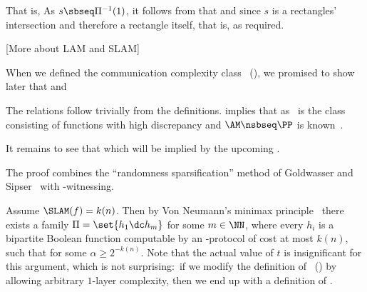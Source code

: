 That is,
As $s\sbseq\Pi^{-1}(1)$, it follows from  that
and since $s$ is a rectangles' intersection and therefore a rectangle itself,
that is,
as required.
\prfend

[More about LAM and SLAM]

When we defined the communication complexity class \SLAM\ (), we promised to show later that
\mal{
\NP, \MA, \UAMc, \UAM, \SBP, \LAM ~ \sbseq ~ \SLAM ~ \sbs ~ \AM
}
and

The relations
follow trivially from the definitions.
 implies that
\mal{
\SLAM ~ \sbseq ~ \PP
~~ \Then ~~
\SLAM ~ \sbs ~ \AM
\,,}
as \PP\ is the class consisting of functions with high discrepancy and $\AM\nsbseq\PP$ is known~\cite{K11_On}.

It remains to see that 
\mal{
\UAM\cup\SBP \sbs \SLAM \sbseq ~ \AM
\,,}
which will be implied by the upcoming .


The proof combines the ``randomness sparsification'' method of Goldwasser and Sipser~\cite{GS86_Pri} with \NP-witnessing.

Assume $\SLAM(f)=k(n)$.
Then by Von Neumann's minimax principle~\cite{N28_Zur} there exists a family
$\Pi=\set{h_1\dc h_m}$ for some $m\in\NN$, where every $h_i$ is a bipartite Boolean function computable by an \NP-protocol of cost at most $k(n)$, such that
for some $\alpha\ge2^{-k(n)}$.\fn
{
Note that the actual value of $t$ is insignificant for this argument, which is not surprising:\ if we modify the definition of \SLAM\ () by allowing arbitrary $1$-layer complexity, then we end up with a definition of \AM.
}

